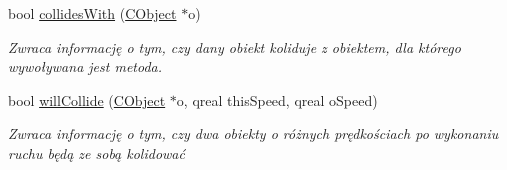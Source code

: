 \begin{DoxyCompactItemize}
bool \mbox{\hyperlink{class_c_object_ad744a67920a169209f631f9e34f1d891}{collides\+With}} (\mbox{\hyperlink{class_c_object}{C\+Object}} $\ast$o)
\begin{DoxyCompactList}\small\item\em Zwraca informację o tym, czy dany obiekt koliduje z obiektem, dla którego wywoływana jest metoda. \end{DoxyCompactList}\item 
bool \mbox{\hyperlink{class_c_object_a24bf5bc6cf7e76478ac7ccc7c79cdd72}{will\+Collide}} (\mbox{\hyperlink{class_c_object}{C\+Object}} $\ast$o, qreal this\+Speed, qreal o\+Speed)
\begin{DoxyCompactList}\small\item\em Zwraca informację o tym, czy dwa obiekty o różnych prędkościach po wykonaniu ruchu będą ze sobą kolidować \end{DoxyCompactList}\end{DoxyCompactItemize}
